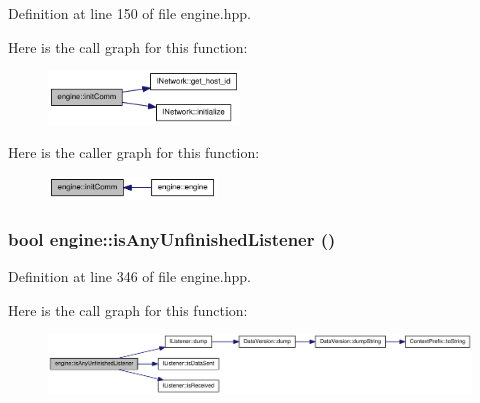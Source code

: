 Definition at line 150 of file engine.hpp.

Here is the call graph for this function:\nopagebreak
\begin{figure}[H]
\begin{center}
\leavevmode
\includegraphics[width=144pt]{classengine_ac26f49a93305875e96b66807e9344f7d_cgraph}
\end{center}
\end{figure}


Here is the caller graph for this function:\nopagebreak
\begin{figure}[H]
\begin{center}
\leavevmode
\includegraphics[width=127pt]{classengine_ac26f49a93305875e96b66807e9344f7d_icgraph}
\end{center}
\end{figure}
\hypertarget{classengine_ab711383a9b6380efdc76eabc98f628de}{
\subsubsection[{isAnyUnfinishedListener}]{\setlength{\rightskip}{0pt plus 5cm}bool engine::isAnyUnfinishedListener ()}}
\label{classengine_ab711383a9b6380efdc76eabc98f628de}


Definition at line 346 of file engine.hpp.

Here is the call graph for this function:\nopagebreak
\begin{figure}[H]
\begin{center}
\leavevmode
\includegraphics[width=400pt]{classengine_ab711383a9b6380efdc76eabc98f628de_cgraph}
\end{center}
\end{figure}


